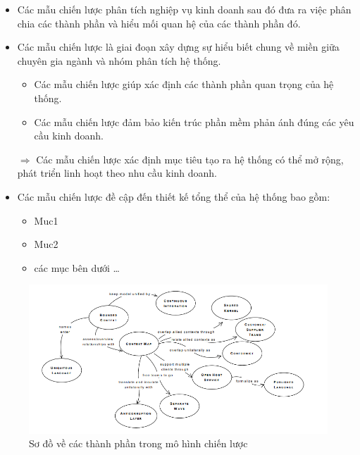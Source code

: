 \begin{itemize}

    \item Các mẫu chiến lược phân tích nghiệp vụ kinh doanh sau đó đưa ra việc phân chia các thành phần và hiểu mối quan hệ của các thành phần đó.
    
    \item Các mẫu chiến lược là giai đoạn xây dựng sự hiểu biết chung về miền giữa chuyên gia ngành và nhóm phân tích hệ thống.
    
    \begin{itemize}
    
    \item Các mẫu chiến lược giúp xác định các thành phần quan trọng của hệ thống.
    
    \item Các mẫu chiến lược đảm bảo kiến trúc phần mềm phản ánh đúng các yêu cầu kinh doanh.
    
    \end{itemize}
    
    $\Rightarrow$ Các mẫu chiến lược xác định mục tiêu tạo ra hệ thống có thể mở rộng, phát triển linh hoạt theo nhu cầu kinh doanh.
    
    \item Các mẫu chiến lược đề cập đến thiết kế tổng thể của hệ thống bao gồm:
    
    \begin{itemize}
    
    \item Muc1
    
    \item Muc2
    
    \item các mục bên dưới \dots
    
    \end{itemize}
    
    \end{itemize}
    
    \begin{figure}[H]
    
    \centering
    
    \includegraphics[width = 1\textwidth]{pictures/CacMoHinhChienLuoc/temp.png}
    
    \caption{Sơ đồ về các thành phần trong mô hình chiến lược}
    
    \end{figure}
    
